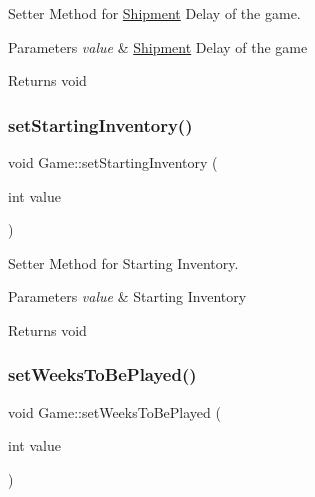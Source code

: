 Setter Method for \hyperlink{classShipment}{Shipment} Delay of the game. 


\begin{DoxyParams}{Parameters}
{\em value} & \hyperlink{classShipment}{Shipment} Delay of the game \\
\hline
\end{DoxyParams}
\begin{DoxyReturn}{Returns}
void 
\end{DoxyReturn}
\mbox{\label{classGame_a5b75bc16fa3a510ef8e2e43a6e2294d2}} 
\subsubsection{\texorpdfstring{set\+Starting\+Inventory()}{setStartingInventory()}}
{\footnotesize\ttfamily void Game\+::set\+Starting\+Inventory (\begin{DoxyParamCaption}\item[{int}]{value }\end{DoxyParamCaption})}



Setter Method for Starting Inventory. 


\begin{DoxyParams}{Parameters}
{\em value} & Starting Inventory \\
\hline
\end{DoxyParams}
\begin{DoxyReturn}{Returns}
void 
\end{DoxyReturn}
\mbox{\label{classGame_ab4e0f6a606c804dd9d39a667ed356ee1}} 
\subsubsection{\texorpdfstring{set\+Weeks\+To\+Be\+Played()}{setWeeksToBePlayed()}}
{\footnotesize\ttfamily void Game\+::set\+Weeks\+To\+Be\+Played (\begin{DoxyParamCaption}\item[{int}]{value }\end{DoxyParamCaption})}



